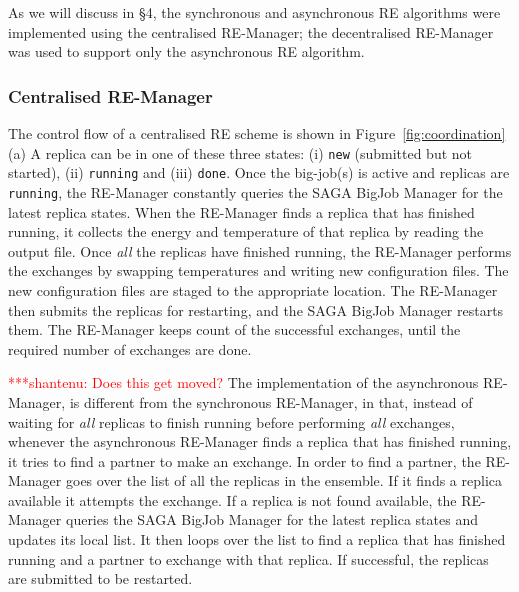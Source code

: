 \documentclass{rspublic}
\newcommand{\jhanote}[1]{ {\textcolor{red} { ***shantenu: #1 }}}
\newcommand{\alnote}[1]{ {\textcolor{blue} { ***andre: #1 }}}
\newcommand{\alnote}[1]{}
\newcommand{\jhanote}[1]{}
\begin{document}


As we will discuss in \S4, the synchronous and asynchronous RE
algorithms were implemented using the centralised RE-Manager; the
decentralised RE-Manager was used to support only the asynchronous RE
algorithm.


\subsubsection{Centralised RE-Manager}



The control flow of a centralised RE scheme is shown in
Figure~\ref{fig:coordination}(a) %
A replica can be in one of these three states:
(i) \texttt{new} (submitted but not started), (ii) \texttt{running}
and (iii) \texttt{done}.  Once the big-job(s) is active and replicas
are \texttt{running}, the RE-Manager constantly queries the SAGA
BigJob Manager for the latest replica states.  When the RE-Manager
finds a replica that has finished running, it collects the energy and
temperature of that replica by reading the output file. Once
\emph{all} the replicas have finished running, the RE-Manager performs
the exchanges by swapping temperatures and writing new configuration
files. The new configuration files are staged to the appropriate
location. The RE-Manager then submits the replicas for restarting, and
the SAGA BigJob Manager restarts them. The RE-Manager keeps count of
the successful exchanges, until the required number of exchanges are
done.

\jhanote{Does this get moved?} The implementation of the asynchronous
RE-Manager, is different from the synchronous RE-Manager, in that,
instead of waiting for \emph{all} replicas to finish running before
performing \emph{all} exchanges, whenever the asynchronous RE-Manager
finds a replica that has finished running, it tries to find a partner
to make an exchange. In order to find a partner, the RE-Manager goes
over the list of all the replicas in the ensemble. If it finds a
replica available it attempts the exchange. If a replica is not found
available, the RE-Manager queries the SAGA BigJob Manager for the
latest replica states and updates its local list. It then loops over
the list to find a replica that has finished running and a partner to
exchange with that replica.  If successful, the replicas are submitted
to be restarted. %
\end{document}
